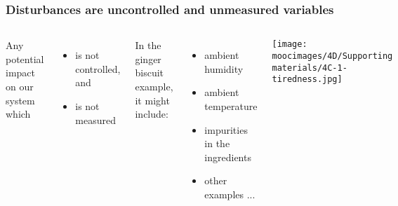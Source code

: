\documentclass[handout,11pt,aspectratio=169,mathserif]{beamer}
\begin{document}
\begin{frame}\frametitle{Disturbances are uncontrolled and unmeasured variables}
	
	\begin{columns}[T]
			Any potential impact on our system which
			\begin{itemize}
				\item	is not controlled, and
		
				\item	is not measured
			\end{itemize}
			
			\vspace{1cm}
			In the ginger biscuit example, it might include:
			\begin{itemize}
				\item	ambient humidity
				\item	ambient temperature
				\item	impurities in the ingredients
				\item	other examples ...
			\end{itemize}
		
			\texttt{[image: \\moocimages/4D/Supporting materials/4C-1-tiredness.jpg]}
	\end{columns}
\end{frame}
\end{document}
